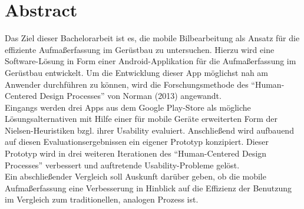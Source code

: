 \chapter*{\centering Abstract}
Das Ziel dieser Bachelorarbeit ist es, die mobile Bilbearbeitung als Ansatz für die effiziente Aufmaßerfassung im Gerüstbau zu untersuchen.
Hierzu wird eine Software-Lösung in Form einer Android-Applikation für die Aufmaßerfassung im Gerüstbau entwickelt.
Um die Entwicklung dieser App möglichst nah am Anwender durchführen zu können, wird die Forschungsmethode des ``Human-Centered Design Processes'' von Norman (2013) angewandt. \\

Eingangs werden drei Apps aus dem Google Play-Store als mögliche Lösungsalternativen mit Hilfe einer für mobile Geräte erweiterten Form der Nielsen-Heuristiken bzgl. ihrer Usability evaluiert.
Anschließend wird aufbauend auf diesen Evaluationsergebnissen ein eigener Prototyp konzipiert.
Dieser Prototyp wird in drei weiteren Iterationen des ``Human-Centered Design Processes'' verbessert und auftretende Usability-Probleme gelöst.  \\

Ein abschließender Vergleich soll Auskunft darüber geben, ob die mobile Aufmaßerfassung eine Verbesserung in Hinblick auf die Effizienz der Benutzung im Vergleich zum traditionellen, analogen Prozess ist.
